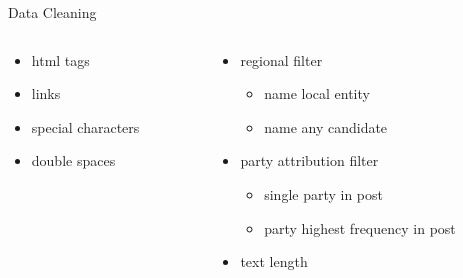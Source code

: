 \begin{frame}{Data Cleaning}
	\begin{columns}
		
		\begin{column}{0.55\textwidth}
			\begin{tcolorbox}[enhanced jigsaw, colback=white, opacityback=.4,  colframe=ElixirPurple, arc=3mm, boxrule=0mm, height=0.8\textheight, valign=center, title=Text Cleaning]
				
				\begin{itemize}
					\item html tags
					\item links
					\item special characters
					\item double spaces
				\end{itemize}
				
				
			\end{tcolorbox}
		\end{column}
		
		\begin{column}{0.55\textwidth}
			\begin{tcolorbox}[enhanced jigsaw, colback=white, opacityback=.4, colframe=ElixirPurple, arc=3mm, boxrule=0mm, height=0.8\textheight, valign=center, title=Post Selection]
				
				\begin{itemize}
					\item regional filter
					\begin{itemize}
						\item name local entity
						\item name any candidate
					\end{itemize}
					\item party attribution filter
					\begin{itemize}
						\item single party in post
						\item party highest frequency in post
					\end{itemize}
					\item text length
				\end{itemize}
				
				
			\end{tcolorbox}
		\end{column}
	\end{columns}
\end{frame}



